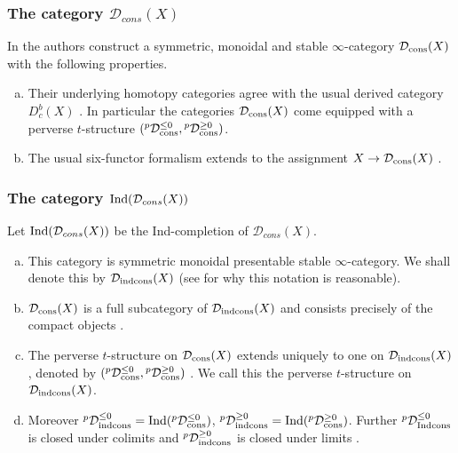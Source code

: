 \documentclass[12pt, reqno]{amsart}
\theoremstyle{plain}
\theoremstyle{definition}
\theoremstyle{definition}
\newcommand{\cD}{{\mathcal D}}
\begin{document}
\subsubsection{The category $\cD_{cons}(X)$}\label{D_cons} In \cite[Definition 1.1]{HRS23} the authors construct a symmetric, monoidal and stable $\infty$-category $\cD_{\textup{cons}}(X)$ with the following properties.

\begin{enumerate}[(a)]
    \item Their underlying homotopy categories agree with the usual derived category $D^b_c(X)$ \cite[Proposition 7.1, Theorem 7.7, Lemma 7.9]{HRS23}. In particular the categories $\cD_{\textup{cons}}(X)$ come equipped with a perverse $t$-structure $({}^{p}\cD_{\textup{cons}}^{\leq 0},{}^p\cD_{\textup{cons}}^{\geq 0})$.
    \item The usual six-functor formalism extends to the assignment $X \to \cD_{\textup{cons}}(X)$ \cite[Remark 7.10]{HRS23}.
\end{enumerate}

\subsubsection{The category $\textup{Ind}(\cD_{cons}(X))$}\label{properties_ind_cons}
Let $\textup{Ind}(\cD_{cons}(X))$ be the Ind-completion \cite[Lemma 5.3.2.9]{HA} of $\cD_{cons}(X)$. 
\begin{enumerate}[(a)]
    \item This category is symmetric monoidal presentable stable $\infty$-category. We shall denote this by $\cD_{\textup{indcons}}(X)$ (see \cite[Corollary 8.3]{HRS23} for why this notation is reasonable).
    \item $\cD_{\textup{cons}}(X)$ is a full subcategory of $\cD_{\textup{indcons}}(X)$ and consists precisely of the compact objects \cite[Proposition 8.2]{HRS23}.
    \item The perverse $t$-structure on $\cD_{\textup{cons}}(X)$ extends uniquely to one on $\cD_{\textup{indcons}}(X)$, denoted by $({}^{p}\cD_{\textup{cons}}^{\leq 0},{}^p\cD_{\textup{cons}}^{\geq 0})$ \cite[Lemma 6.1.2, (a)]{BKV22}. We call this the perverse $t$-structure on $\cD_{\textup{indcons}}(X)$.
    \item Moreover $^{p}\cD_{\textup{indcons}}^{\leq 0}=\textup{Ind}(^{p}\cD_{\textup{cons}}^{\leq 0})$, $^{p}\cD_{\textup{indcons}}^{\geq 0}=\textup{Ind}(^{p}\cD_{\textup{cons}}^{\geq 0})$. Further $^{p}\cD_{\textup{Indcons}}^{\leq 0}$ is closed under colimits and $^{p}\cD_{\textup{indcons}}^{\geq 0}$ is closed under limits \cite[Lemma 6.1.2, (a), (b)]{BKV22}. 
\end{enumerate}
\end{document}
